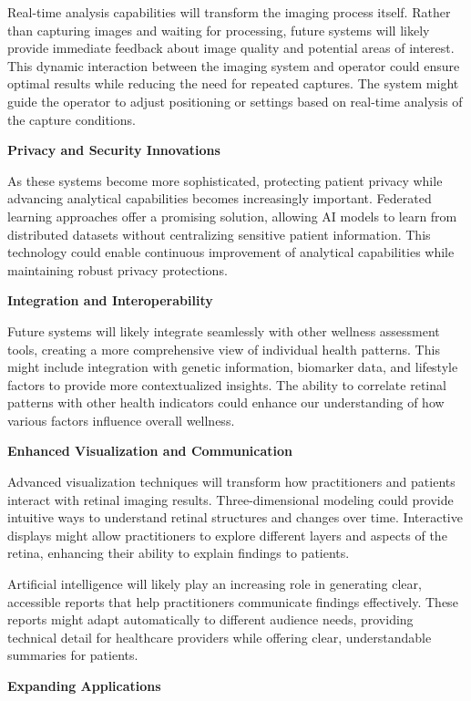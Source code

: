 \documentclass[
  Letterpaper,
]{scrbook}
\begin{document}
Real-time analysis capabilities will transform the imaging process
itself. Rather than capturing images and waiting for processing, future
systems will likely provide immediate feedback about image quality and
potential areas of interest. This dynamic interaction between the
imaging system and operator could ensure optimal results while reducing
the need for repeated captures. The system might guide the operator to
adjust positioning or settings based on real-time analysis of the
capture conditions.

\textbf{Privacy and Security Innovations}

As these systems become more sophisticated, protecting patient privacy
while advancing analytical capabilities becomes increasingly important.
Federated learning approaches offer a promising solution, allowing AI
models to learn from distributed datasets without centralizing sensitive
patient information. This technology could enable continuous improvement
of analytical capabilities while maintaining robust privacy protections.

\textbf{Integration and Interoperability}

Future systems will likely integrate seamlessly with other wellness
assessment tools, creating a more comprehensive view of individual
health patterns. This might include integration with genetic
information, biomarker data, and lifestyle factors to provide more
contextualized insights. The ability to correlate retinal patterns with
other health indicators could enhance our understanding of how various
factors influence overall wellness.

\textbf{Enhanced Visualization and Communication}

Advanced visualization techniques will transform how practitioners and
patients interact with retinal imaging results. Three-dimensional
modeling could provide intuitive ways to understand retinal structures
and changes over time. Interactive displays might allow practitioners to
explore different layers and aspects of the retina, enhancing their
ability to explain findings to patients.

Artificial intelligence will likely play an increasing role in
generating clear, accessible reports that help practitioners communicate
findings effectively. These reports might adapt automatically to
different audience needs, providing technical detail for healthcare
providers while offering clear, understandable summaries for patients.

\textbf{Expanding Applications}
\end{document}
